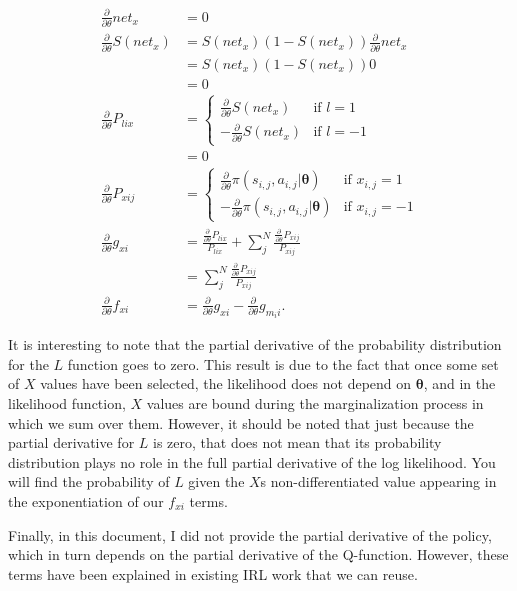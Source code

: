 \documentclass{article}
\begin{document}
\begin{align}
\frac{\partial}{\partial \theta} net_{x} &= 0 \\
\frac{\partial}{\partial \theta} S(net_x) &= S(net_x)(1 - S(net_x))\frac{\partial}{\partial \theta} net_x \nonumber \\
&= S(net_x)(1 - S(net_x)) 0 \nonumber \\
&= 0 \\
\frac{\partial}{\partial \theta} P_{lix} &= \begin{cases}
\frac{\partial}{\partial \theta} S(net_x) & \mbox{if } l = 1 \\
-\frac{\partial}{\partial \theta} S(net_x) & \mbox{if } l = -1
\end{cases} \nonumber \\
&= 0 \\
\frac{\partial}{\partial \theta} P_{xij} &= \begin{cases}
\frac{\partial}{\partial \theta} \pi(s_{i,j}, a_{i,j} | \bm{\theta}) & \mbox{if } x_{i,j} = 1 \\
-\frac{\partial}{\partial \theta} \pi(s_{i,j}, a_{i,j} | \bm{\theta}) & \mbox{if } x_{i,j} = -1
\end{cases} \\
\frac{\partial}{\partial \theta} g_{xi} &= \frac{\frac{\partial}{\partial \theta} P_{lix}}{P_{lix}} + \sum_j^N \frac{\frac{\partial}{\partial \theta} P_{xij}}{P_{xij}} \nonumber \\
&= \sum_j^N \frac{\frac{\partial}{\partial \theta} P_{xij}}{P_{xij}} \\
\frac{\partial}{\partial \theta} f_{xi} & = \frac{\partial}{\partial \theta} g_{xi} - \frac{\partial}{\partial \theta} g_{m_ii}.
\end{align}

It is interesting to note that the partial derivative of the probability distribution for the $L$ function goes to zero. This result is due to the fact that once some set of $X$ values have been selected, the likelihood does not depend on $\bm{\theta}$, and in the likelihood function, $X$ values are bound during the marginalization process in which we sum over them. However, it should be noted that just because the partial derivative for $L$ is zero, that does not mean that its probability distribution plays no role in the full partial derivative of the log likelihood. You will find the probability of $L$ given the $X$s non-differentiated value appearing in the exponentiation of our $f_{xi}$ terms.

Finally, in this document, I did not provide the partial derivative of the policy, which in turn depends on the partial derivative of the Q-function. However, these terms have been explained in existing IRL work that we can reuse.
\end{document}
